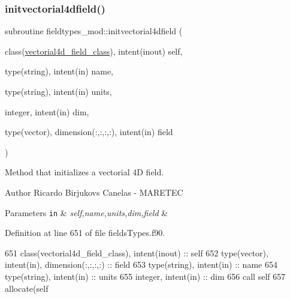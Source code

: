 \subsubsection{\texorpdfstring{initvectorial4dfield()}{initvectorial4dfield()}}
{\footnotesize\ttfamily subroutine fieldtypes\+\_\+mod\+::initvectorial4dfield (\begin{DoxyParamCaption}\item[{class(\mbox{\hyperlink{structfieldtypes__mod_1_1vectorial4d__field__class}{vectorial4d\+\_\+field\+\_\+class}}), intent(inout)}]{self,  }\item[{type(string), intent(in)}]{name,  }\item[{type(string), intent(in)}]{units,  }\item[{integer, intent(in)}]{dim,  }\item[{type(vector), dimension(\+:,\+:,\+:,\+:), intent(in)}]{field }\end{DoxyParamCaption})\hspace{0.3cm}{\ttfamily [private]}}



Method that initializes a vectorial 4D field. 

\begin{DoxyAuthor}{Author}
Ricardo Birjukovs Canelas -\/ M\+A\+R\+E\+T\+EC 
\end{DoxyAuthor}

\begin{DoxyParams}[1]{Parameters}
\mbox{\tt in}  & {\em self,name,units,dim,field} & \\
\hline
\end{DoxyParams}


Definition at line 651 of file fields\+Types.\+f90.


\begin{DoxyCode}
651     \textcolor{keywordtype}{class}(vectorial4d\_field\_class), \textcolor{keywordtype}{intent(inout)} :: self
652     \textcolor{keywordtype}{type}(vector), \textcolor{keywordtype}{intent(in)}, \textcolor{keywordtype}{dimension(:,:,:,:)} :: field
653     \textcolor{keywordtype}{type}(string), \textcolor{keywordtype}{intent(in)} :: name
654     \textcolor{keywordtype}{type}(string), \textcolor{keywordtype}{intent(in)} :: units
655     \textcolor{keywordtype}{integer}, \textcolor{keywordtype}{intent(in)} :: dim
656     \textcolor{keyword}{call }self%
657     \textcolor{keyword}{allocate}(self%
\end{DoxyCode}
\mbox{\label{namespacefieldtypes__mod_a5a556fba603c1d39b20713fdbc813332}} 
